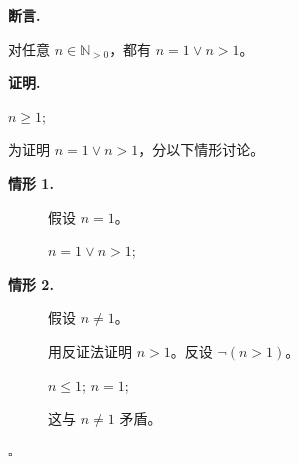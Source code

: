 \documentclass[11pt]{article}
\begin{document}
\par\medskip\noindent\textbf{断言.}\par\nopagebreak[4]
\par\noindent 对任意 $n\in \mathbb{N}_{>0}$，都有 $n = 1 \lor n > 1$。\par
\par\medskip\noindent\textbf{证明.}\par\nopagebreak[4]
$n \geq 1$;
\par\noindent 为证明 $n = 1 \lor n > 1$，分以下情形讨论。\par
\begin{description}
\item[\textbf{情形 1.}] 假设 $n = 1$。\par
$n = 1 \lor n > 1$;
\item[\textbf{情形 2.}] 假设 $n \ne 1$。\par
\par\noindent 用反证法证明 $n > 1$。反设 $\neg\left(n > 1\right)$。\par
$n \leq 1$;
$n = 1$;
\par\noindent 这与 $n \ne 1$ 矛盾。\par
\end{description}
\par\nobreak\hfill$\square$\par
\end{document}
